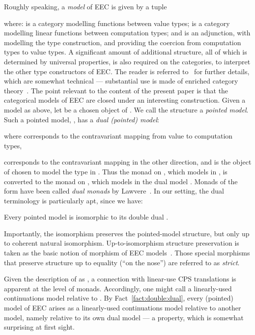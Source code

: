 \documentclass{LMCS}
\begin{document}
Roughly speaking, a \emph{model}  of EEC
is given by a tuple 

where:  is a category modelling functions between value types;
 is a category modelling linear functions between computation types;
and  is an adjunction, with   modelling the  type construction,
and  providing the coercion from computation types to value types.
A significant amount of 
additional structure,
all of which is determined by universal properties,
is also required on the categories, to interpret the other type constructors of EEC.
The reader is referred to~\cite{EMS,EMSb,EMSc} for further details,
which are somewhat technical --- substantial use is made of 
{enriched category theory}~\cite{Kelly:book}.
The point relevant to the content of the present paper is that 
the categorical models of EEC are closed under an interesting construction.
Given a model as above, let  be a chosen object of .
We call the structure 
 a
\emph{pointed model}. 
Such a pointed model, , has a \emph{dual (pointed) model}:

where  corresponds to the contravariant mapping  from value to computation types,
 
corresponds to the contravariant mapping  in the other direction,
and  is the object of  chosen to model the type  in .
Thus the monad  on , which models  in ,
is converted to the monad  on 
, which models  in the dual model .
Monads of the form  have been called \emph{dual monads} 
by Lawvere~\cite{Lawvere:doctrines}. In our setting, the dual terminology is particularly
apt, since we have:
\begin{fact}
\label{fact:double:dual}
Every pointed model  is isomorphic to its double dual .
\end{fact}
\noindent
Importantly, the isomorphism preserves the pointed-model structure, but only up
to coherent natural isomorphism. Up-to-isomorphism structure preservation
is taken as the basic notion of morphism of EEC models~\cite{EMS,EMSc}.
Those  special morphisms that preserve structure up to equality (``on the nose'')
are referred to as \emph{strict}.


Given the description of  as ,
a connection with linear-use CPS translations is apparent at the level 
of  monads. Accordingly, one might call  a linearly-used continuations
model relative to . By Fact~\ref{fact:double:dual},
every (pointed) model of EEC arises as a linearly-used continuations model relative
to another model, namely relative to its own dual model --- a property, which is somewhat
surprising at first sight. 
\end{document}
